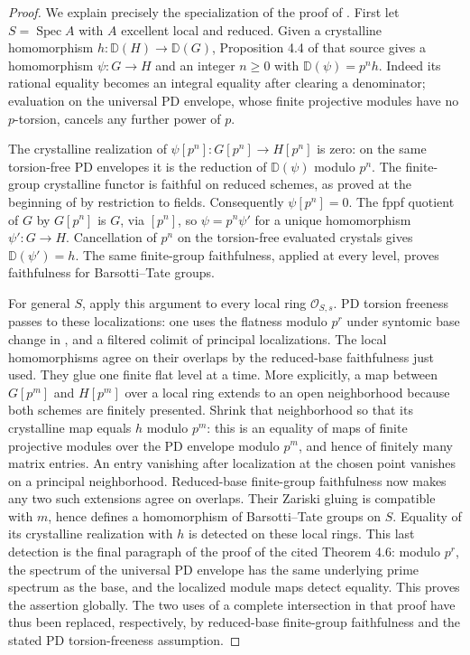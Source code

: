 \begin{proof}
We explain precisely the specialization of the proof of
\cite[Theorem 4.6]{B:deJongMessing1999}. First let $S=\operatorname{Spec}A$
with $A$ excellent local and reduced. Given a crystalline homomorphism
$h:\mathbb D(H)\to\mathbb D(G)$, Proposition 4.4 of that source gives
a homomorphism $\psi:G\to H$ and an integer $n\geq0$ with
$\mathbb D(\psi)=p^nh$. Indeed its rational equality becomes an
integral equality after clearing a denominator; evaluation on the
universal PD envelope, whose finite projective modules have no
$p$-torsion, cancels any further power of $p$.

The crystalline realization of $\psi[p^n]:G[p^n]\to H[p^n]$ is zero:
on the same torsion-free PD envelopes it is the reduction of
$\mathbb D(\psi)$ modulo $p^n$. The finite-group crystalline functor
is faithful on reduced schemes, as proved at the beginning of
\cite[Section 1]{B:deJongMessing1999} by restriction to fields.
Consequently $\psi[p^n]=0$. The fppf quotient of $G$ by $G[p^n]$
is $G$, via $[p^n]$, so $\psi=p^n\psi'$ for a unique homomorphism
$\psi':G\to H$. Cancellation of $p^n$ on the torsion-free evaluated
crystals gives $\mathbb D(\psi')=h$. The same finite-group
faithfulness, applied at every level, proves faithfulness for
Barsotti--Tate groups.

For general $S$, apply this argument to every local ring
$\mathcal O_{S,s}$. PD torsion freeness passes to these localizations:
one uses the flatness modulo $p^r$ under syntomic base change in
\cite[Lemma 4.7 and Corollary 4.8]{B:LauDivided}, and a filtered
colimit of principal localizations. The local homomorphisms agree
on their overlaps by the reduced-base faithfulness just used.
They glue one finite flat level at a time. More explicitly, a map
between $G[p^m]$ and $H[p^m]$ over a local ring extends to an open
neighborhood because both schemes are finitely presented. Shrink
that neighborhood so that its crystalline map equals $h$ modulo
$p^m$: this is an equality of maps of finite projective modules
over the PD envelope modulo $p^m$, and hence of finitely many
matrix entries. An entry vanishing after localization at the chosen
point vanishes on a principal neighborhood. Reduced-base finite-group
faithfulness now makes any two such extensions agree on overlaps.
Their Zariski gluing is compatible with $m$, hence defines a
homomorphism of Barsotti--Tate groups on $S$.
Equality of its crystalline realization with $h$ is detected on
these local rings. This last detection is the final paragraph of
the proof of the cited Theorem 4.6: modulo $p^r$, the spectrum of
the universal PD envelope has the same underlying prime spectrum
as the base, and the localized module maps detect equality.
This proves the assertion globally. The two uses of a complete
intersection in that proof have thus been replaced, respectively,
by reduced-base finite-group faithfulness and the stated PD
torsion-freeness assumption.
\end{proof}

